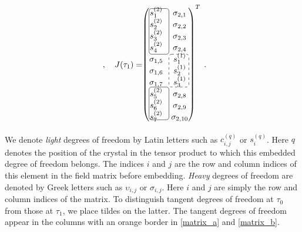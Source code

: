 \documentclass[10pt]{article}
\theoremstyle{definition}
\numberwithin{equation}{section}
\begin{document}
\begin{subequations}
\begin{equation}
\begin{array}{c}
\begin{tikzpicture}
	\end{tikzpicture}
	\end{array}\hspace{-2mm},\quad J(\tau_1)=\hspace{-4mm}\begin{array}{c}
	\begin{tikzpicture}
		\node{$\begin{pmatrix}
				s_1^{(2)} & \sigma_{2,1}\\ 
				s_2^{(2)} & \sigma_{2,2}\\
				s_3^{(2)} & \sigma_{2,3}\\
				s_4^{(2)} & \sigma_{2,4}\\
				\sigma_{1,5} & s_1^{(1)}\\
				\sigma_{1,6} & s_2^{(1)}\\
				\sigma_{1,7} & s_3^{(1)}\\
				s_5^{(2)} & \sigma_{2,8}\\
				s_6^{(2)} & \sigma_{2,9}\\
				s_7^{(2)} & \sigma_{2,10}\\
			\end{pmatrix}^T$};
		\draw[rounded corners=3] (-0.95,2.35) -- (-0.1,2.35) -- (-0.1,0.4) -- (-0.95,0.4) -- cycle;
		\draw[rounded corners=3, dashed] (-0.1,0.4) -- (0.75,0.4) -- (0.75,-1) -- (-0.1,-1) -- cycle;
		\draw[rounded corners=3] (-0.95,-1) -- (-0.1,-1) -- (-0.1,-2.4) -- (-0.95,-2.4) -- cycle;
	\end{tikzpicture}
	\end{array}\hspace{-2mm}\,.
\end{equation}
\end{subequations}
We denote \emph{light} degrees of freedom by Latin letters such as $c_{i,j}^{(q)}$ or $s_i^{(q)}$.
Here $q$ denotes the position of the crystal in the tensor product to which this embedded degree of freedom belongs.
The indices $i$ and $j$ are the row and column indices of this element in the field matrix before embedding.
\emph{Heavy} degrees of freedom are denoted by Greek letters such as $\upsilon_{i,j}$ or $\sigma_{i,j}$.
Here $i$ and $j$ are simply the row and column indices of the matrix.
To distinguish tangent degrees of freedom at $\tau_0$ from those at $\tau_1$, we place tildes on the latter.
The tangent degrees of freedom appear in the columns with an orange border in \eqref{matrix_a} and \eqref{matrix_b}.
\end{document}
